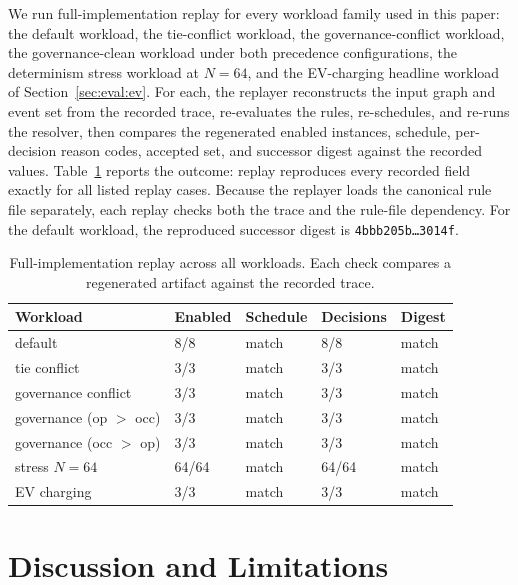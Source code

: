 \documentclass{ieeeaccess}
\theoremstyle{definition}
\theoremstyle{plain}
\theoremstyle{remark}
\begin{document}
We run full-implementation replay for every workload family used in this paper: the default workload, the tie-conflict workload, the governance-conflict workload, the governance-clean workload under both precedence configurations, the determinism stress workload at $N{=}64$, and the EV-charging headline workload of Section~\ref{sec:eval:ev}. For each, the replayer reconstructs the input graph and event set from the recorded trace, re-evaluates the rules, re-schedules, and re-runs the resolver, then compares the regenerated enabled instances, schedule, per-decision reason codes, accepted set, and successor digest against the recorded values. Table~\ref{tab:replay} reports the outcome: replay reproduces every recorded field exactly for all listed replay cases. Because the replayer loads the canonical rule file separately, each replay checks both the trace and the rule-file dependency. For the default workload, the reproduced successor digest is \texttt{4bbb205b\ldots3014f}.

\begin{table}[t]
\caption{Full-implementation replay across all workloads. Each check compares a regenerated artifact against the recorded trace.}
\label{tab:replay}
\centering
\small
\begin{tabular}{|p{2.6cm}|p{1.0cm}|p{1.1cm}|p{1.2cm}|p{1.0cm}|}
\hline
\textbf{Workload} & \textbf{Enabled} & \textbf{Schedule} & \textbf{Decisions} & \textbf{Digest} \\
\hline
default                  & 8/8 & match & 8/8 & match \\
\hline
tie conflict             & 3/3 & match & 3/3 & match \\
\hline
governance conflict      & 3/3 & match & 3/3 & match \\
\hline
governance (op $>$ occ)  & 3/3 & match & 3/3 & match \\
\hline
governance (occ $>$ op)  & 3/3 & match & 3/3 & match \\
\hline
stress $N{=}64$          & 64/64 & match & 64/64 & match \\
\hline
EV charging              & 3/3 & match & 3/3 & match \\
\hline
\end{tabular}
\end{table}


\section{Discussion and Limitations}
\end{document}

